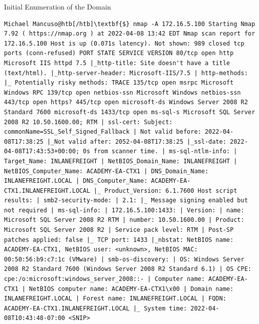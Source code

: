 Initial Enumeration of the Domain

\begin{verbatim}
Michael Mancuso@htb[/htb]\textbf{$} nmap -A 172.16.5.100 Starting Nmap 7.92 ( https://nmap.org ) at 2022-04-08 13:42 EDT Nmap scan report for 172.16.5.100 Host is up (0.071s latency). Not shown: 989 closed tcp ports (conn-refused) PORT STATE SERVICE VERSION 80/tcp open http Microsoft IIS httpd 7.5 |_http-title: Site doesn't have a title (text/html). |_http-server-header: Microsoft-IIS/7.5 | http-methods: |_ Potentially risky methods: TRACE 135/tcp open msrpc Microsoft Windows RPC 139/tcp open netbios-ssn Microsoft Windows netbios-ssn 443/tcp open https? 445/tcp open microsoft-ds Windows Server 2008 R2 Standard 7600 microsoft-ds 1433/tcp open ms-sql-s Microsoft SQL Server 2008 R2 10.50.1600.00; RTM | ssl-cert: Subject: commonName=SSL_Self_Signed_Fallback | Not valid before: 2022-04-08T17:38:25 |_Not valid after: 2052-04-08T17:38:25 |_ssl-date: 2022-04-08T17:43:53+00:00; 0s from scanner time. | ms-sql-ntlm-info: | Target_Name: INLANEFREIGHT | NetBIOS_Domain_Name: INLANEFREIGHT | NetBIOS_Computer_Name: ACADEMY-EA-CTX1 | DNS_Domain_Name: INLANEFREIGHT.LOCAL | DNS_Computer_Name: ACADEMY-EA-CTX1.INLANEFREIGHT.LOCAL |_ Product_Version: 6.1.7600 Host script results: | smb2-security-mode: | 2.1: |_ Message signing enabled but not required | ms-sql-info: | 172.16.5.100:1433: | Version: | name: Microsoft SQL Server 2008 R2 RTM | number: 10.50.1600.00 | Product: Microsoft SQL Server 2008 R2 | Service pack level: RTM | Post-SP patches applied: false |_ TCP port: 1433 |_nbstat: NetBIOS name: ACADEMY-EA-CTX1, NetBIOS user: <unknown>, NetBIOS MAC: 00:50:56:b9:c7:1c (VMware) | smb-os-discovery: | OS: Windows Server 2008 R2 Standard 7600 (Windows Server 2008 R2 Standard 6.1) | OS CPE: cpe:/o:microsoft:windows_server_2008::- | Computer name: ACADEMY-EA-CTX1 | NetBIOS computer name: ACADEMY-EA-CTX1\x00 | Domain name: INLANEFREIGHT.LOCAL | Forest name: INLANEFREIGHT.LOCAL | FQDN: ACADEMY-EA-CTX1.INLANEFREIGHT.LOCAL |_ System time: 2022-04-08T10:43:48-07:00 <SNIP> 
\end{verbatim}

